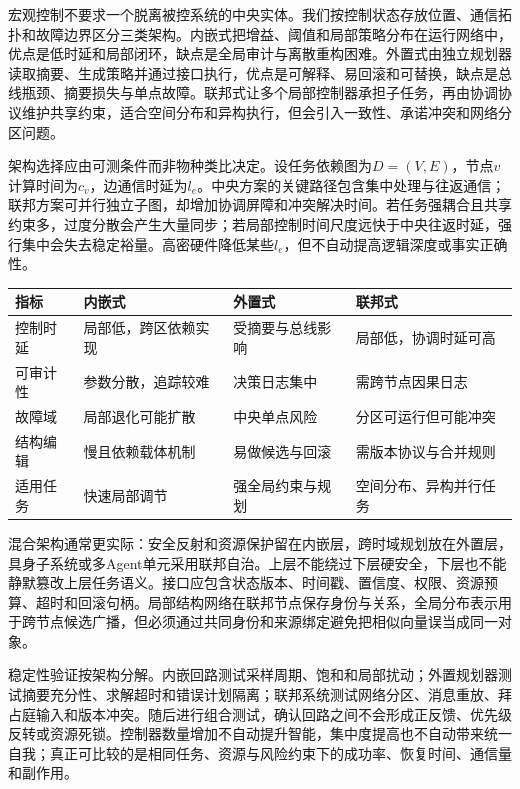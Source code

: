 宏观控制不要求一个脱离被控系统的中央实体。我们按控制状态存放位置、通信拓扑和故障边界区分三类架构。内嵌式把增益、阈值和局部策略分布在运行网络中，优点是低时延和局部闭环，缺点是全局审计与离散重构困难。外置式由独立规划器读取摘要、生成策略并通过接口执行，优点是可解释、易回滚和可替换，缺点是总线瓶颈、摘要损失与单点故障。联邦式让多个局部控制器承担子任务，再由协调协议维护共享约束，适合空间分布和异构执行，但会引入一致性、承诺冲突和网络分区问题。

架构选择应由可测条件而非物种类比决定。设任务依赖图为$D=(V,E)$，节点$v$计算时间为$c_v$，边通信时延为$l_e$。中央方案的关键路径包含集中处理与往返通信；联邦方案可并行独立子图，却增加协调屏障和冲突解决时间。若任务强耦合且共享约束多，过度分散会产生大量同步；若局部控制时间尺度远快于中央往返时延，强行集中会失去稳定裕量。高密硬件降低某些$l_e$，但不自动提高逻辑深度或事实正确性。

\begin{table}[htbp]
\centering\footnotesize
\begin{tabularx}{\textwidth}{lXXX}
\toprule
\rowcolor{structurecolor!20} 指标 & 内嵌式 & 外置式 & 联邦式 \\
\midrule
控制时延 & 局部低，跨区依赖实现 & 受摘要与总线影响 & 局部低，协调时延可高 \\
可审计性 & 参数分散，追踪较难 & 决策日志集中 & 需跨节点因果日志 \\
故障域 & 局部退化可能扩散 & 中央单点风险 & 分区可运行但可能冲突 \\
结构编辑 & 慢且依赖载体机制 & 易做候选与回滚 & 需版本协议与合并规则 \\
适用任务 & 快速局部调节 & 强全局约束与规划 & 空间分布、异构并行任务 \\
\bottomrule
\end{tabularx}
\end{table}

混合架构通常更实际：安全反射和资源保护留在内嵌层，跨时域规划放在外置层，具身子系统或多Agent单元采用联邦自治。上层不能绕过下层硬安全，下层也不能静默篡改上层任务语义。接口应包含状态版本、时间戳、置信度、权限、资源预算、超时和回滚句柄。局部结构网络在联邦节点保存身份与关系，全局分布表示用于跨节点候选广播，但必须通过共同身份和来源绑定避免把相似向量误当成同一对象。

稳定性验证按架构分解。内嵌回路测试采样周期、饱和和局部扰动；外置规划器测试摘要充分性、求解超时和错误计划隔离；联邦系统测试网络分区、消息重放、拜占庭输入和版本冲突。随后进行组合测试，确认回路之间不会形成正反馈、优先级反转或资源死锁。控制器数量增加不自动提升智能，集中度提高也不自动带来统一自我；真正可比较的是相同任务、资源与风险约束下的成功率、恢复时间、通信量和副作用。

